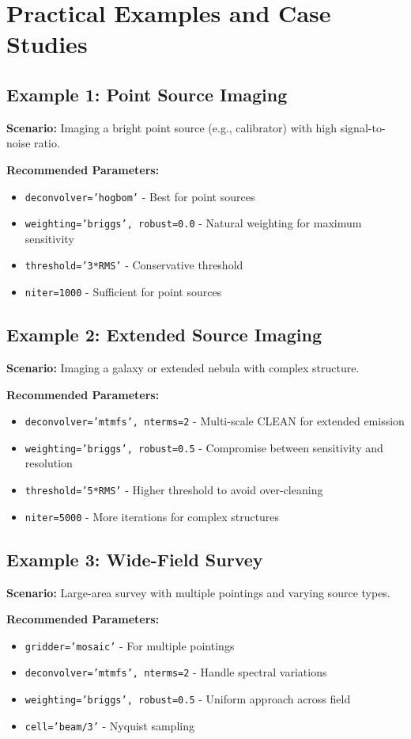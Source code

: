 \documentclass[11pt]{article}
\begin{document}
\section{Practical Examples and Case Studies}

\subsection{Example 1: Point Source Imaging}
\textbf{Scenario:} Imaging a bright point source (e.g., calibrator) with high signal-to-noise ratio.

\textbf{Recommended Parameters:}
\begin{itemize}
    \item \texttt{deconvolver='hogbom'} - Best for point sources
    \item \texttt{weighting='briggs', robust=0.0} - Natural weighting for maximum sensitivity
    \item \texttt{threshold='3*RMS'} - Conservative threshold
    \item \texttt{niter=1000} - Sufficient for point sources
\end{itemize}

\subsection{Example 2: Extended Source Imaging}
\textbf{Scenario:} Imaging a galaxy or extended nebula with complex structure.

\textbf{Recommended Parameters:}
\begin{itemize}
    \item \texttt{deconvolver='mtmfs', nterms=2} - Multi-scale CLEAN for extended emission
    \item \texttt{weighting='briggs', robust=0.5} - Compromise between sensitivity and resolution
    \item \texttt{threshold='5*RMS'} - Higher threshold to avoid over-cleaning
    \item \texttt{niter=5000} - More iterations for complex structures
\end{itemize}

\subsection{Example 3: Wide-Field Survey}
\textbf{Scenario:} Large-area survey with multiple pointings and varying source types.

\textbf{Recommended Parameters:}
\begin{itemize}
    \item \texttt{gridder='mosaic'} - For multiple pointings
    \item \texttt{deconvolver='mtmfs', nterms=2} - Handle spectral variations
    \item \texttt{weighting='briggs', robust=0.5} - Uniform approach across field
    \item \texttt{cell='beam/3'} - Nyquist sampling
\end{itemize}
\end{document}
